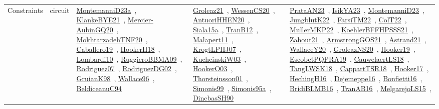 {\begin{longtable}{lp{3cm}>{\raggedright\arraybackslash}p{6cm}>{\raggedright\arraybackslash}p{6cm}>{\raggedright\arraybackslash}p{8cm}}
Constraints & circuit & \href{works/MontemanniD23a.pdf}{MontemanniD23a}~\cite{MontemanniD23a}, \href{works/KlankeBYE21.pdf}{KlankeBYE21}~\cite{KlankeBYE21}, \href{works/Mercier-AubinGQ20.pdf}{Mercier-AubinGQ20}~\cite{Mercier-AubinGQ20}, \href{works/MokhtarzadehTNF20.pdf}{MokhtarzadehTNF20}~\cite{MokhtarzadehTNF20}, \href{works/Caballero19.pdf}{Caballero19}~\cite{Caballero19}, \href{works/HookerH18.pdf}{HookerH18}~\cite{HookerH18}, \href{works/Lombardi10.pdf}{Lombardi10}~\cite{Lombardi10}, \href{works/RuggieroBBMA09.pdf}{RuggieroBBMA09}~\cite{RuggieroBBMA09}, \href{works/Rodriguez07.pdf}{Rodriguez07}~\cite{Rodriguez07}, \href{works/RodriguezDG02.pdf}{RodriguezDG02}~\cite{RodriguezDG02}, \href{works/GruianK98.pdf}{GruianK98}~\cite{GruianK98}, \href{works/Wallace96.pdf}{Wallace96}~\cite{Wallace96}, \href{works/BeldiceanuC94.pdf}{BeldiceanuC94}~\cite{BeldiceanuC94} & \href{works/Groleaz21.pdf}{Groleaz21}~\cite{Groleaz21}, \href{works/WessenCS20.pdf}{WessenCS20}~\cite{WessenCS20}, \href{works/AntuoriHHEN20.pdf}{AntuoriHHEN20}~\cite{AntuoriHHEN20}, \href{works/Siala15a.pdf}{Siala15a}~\cite{Siala15a}, \href{works/TranB12.pdf}{TranB12}~\cite{TranB12}, \href{works/Malapert11.pdf}{Malapert11}~\cite{Malapert11}, \href{works/KrogtLPHJ07.pdf}{KrogtLPHJ07}~\cite{KrogtLPHJ07}, \href{works/KuchcinskiW03.pdf}{KuchcinskiW03}~\cite{KuchcinskiW03}, \href{works/HookerO03.pdf}{HookerO03}~\cite{HookerO03}, \href{works/Thorsteinsson01.pdf}{Thorsteinsson01}~\cite{Thorsteinsson01}, \href{works/Simonis99.pdf}{Simonis99}~\cite{Simonis99}, \href{works/Simonis95a.pdf}{Simonis95a}~\cite{Simonis95a}, \href{works/DincbasSH90.pdf}{DincbasSH90}~\cite{DincbasSH90} & \href{works/PrataAN23.pdf}{PrataAN23}~\cite{PrataAN23}, \href{works/IsikYA23.pdf}{IsikYA23}~\cite{IsikYA23}, \href{works/MontemanniD23.pdf}{MontemanniD23}~\cite{MontemanniD23}, \href{works/JungblutK22.pdf}{JungblutK22}~\cite{JungblutK22}, \href{works/FarsiTM22.pdf}{FarsiTM22}~\cite{FarsiTM22}, \href{works/ColT22.pdf}{ColT22}~\cite{ColT22}, \href{works/MullerMKP22.pdf}{MullerMKP22}~\cite{MullerMKP22}, \href{works/KoehlerBFFHPSSS21.pdf}{KoehlerBFFHPSSS21}~\cite{KoehlerBFFHPSSS21}, \href{works/Zahout21.pdf}{Zahout21}~\cite{Zahout21}, \href{works/ArmstrongGOS21.pdf}{ArmstrongGOS21}~\cite{ArmstrongGOS21}, \href{works/Astrand21.pdf}{Astrand21}~\cite{Astrand21}, \href{works/WallaceY20.pdf}{WallaceY20}~\cite{WallaceY20}, \href{works/GroleazNS20.pdf}{GroleazNS20}~\cite{GroleazNS20}, \href{works/Hooker19.pdf}{Hooker19}~\cite{Hooker19}, \href{works/EscobetPQPRA19.pdf}{EscobetPQPRA19}~\cite{EscobetPQPRA19}, \href{works/CauwelaertLS18.pdf}{CauwelaertLS18}~\cite{CauwelaertLS18}, \href{works/TangLWSK18.pdf}{TangLWSK18}~\cite{TangLWSK18}, \href{works/CappartTSR18.pdf}{CappartTSR18}~\cite{CappartTSR18}, \href{works/Hooker17.pdf}{Hooker17}~\cite{Hooker17}, \href{works/HechingH16.pdf}{HechingH16}~\cite{HechingH16}, \href{works/Dejemeppe16.pdf}{Dejemeppe16}~\cite{Dejemeppe16}, \href{works/Bonfietti16.pdf}{Bonfietti16}~\cite{Bonfietti16}, \href{works/BridiBLMB16.pdf}{BridiBLMB16}~\cite{BridiBLMB16}, \href{works/TranAB16.pdf}{TranAB16}~\cite{TranAB16}, \href{works/MelgarejoLS15.pdf}{MelgarejoLS15}~\cite{MelgarejoLS15}, 
\end{longtable}}
